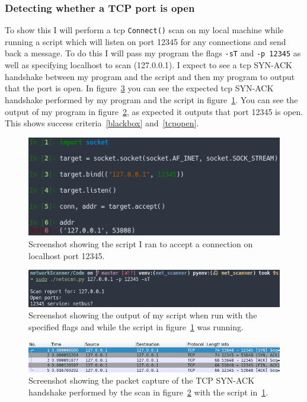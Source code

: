\documentclass[titlepage]{article}
\let\Oldsubsubsection\subsubsection{}
\renewcommand{\subsubsection}{\FloatBarrier\Oldsubsubsection}
\begin{document}
\subsubsection{Detecting whether a TCP port is open}
To show this I will perform a \gls{tcp} \verb|Connect()| scan on my local
machine while running a script which will listen on port 12345 for any connections
and send back a message. To do this I will pass my program the flags \verb|-sT| and
\verb|-p 12345| as well as specifying localhost to scan (127.0.0.1).
I expect to see a \gls{tcp} SYN-ACK handshake between my program and the script and
then my program to output that the port is open. In figure~\ref{tcpopenpcap} you can
see the expected \gls{tcp} SYN-ACK handshake performed by my program and the script
in figure~\ref{tcpopenscript}.
You can see the output of my program in figure~\ref{tcpopenoutput}, as expected
it outputs that port 12345 is open. This shows success criteria~\ref{blackbox}
and~\ref{tcpopen}.

\begin{figure}[H]
  \centering
  \includegraphics[width=\textwidth]{tcpopenscript.png}
  \caption{%
    Screenshot showing the script I ran to accept a connection on localhost port 12345.
  }\label{tcpopenscript}
\end{figure}

\begin{figure}[H]
  \centering
  \includegraphics[width=\textwidth]{tcpopenoutput.png}
  \caption{%
    Screenshot showing the output of my script when run with the specified flags
    and while the script in figure~\ref{tcpopenscript} was running.
  }\label{tcpopenoutput}
\end{figure}

\begin{figure}[H]
  \centering
  \includegraphics[width=\textwidth]{tcpopenpcap.png}
  \caption{%
    Screenshot showing the packet capture of the TCP SYN-ACK handshake performed
    by the scan in figure~\ref{tcpopenoutput} with the script in~\ref{tcpopenscript}.
  }\label{tcpopenpcap}
\end{figure}
\end{document}

